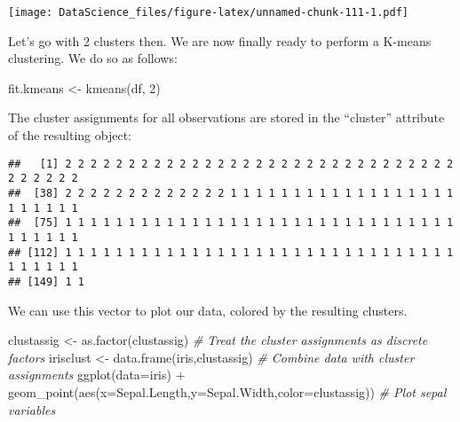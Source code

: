 \documentclass[
]{book}
\newenvironment{Shaded}{\begin{snugshade}}{\end{snugshade}}
\newcommand{\AttributeTok}[1]{\textcolor[rgb]{0.77,0.63,0.00}{#1}}
\newcommand{\CommentTok}[1]{\textcolor[rgb]{0.56,0.35,0.01}{\textit{#1}}}
\newcommand{\DecValTok}[1]{\textcolor[rgb]{0.00,0.00,0.81}{#1}}
\newcommand{\FunctionTok}[1]{\textcolor[rgb]{0.00,0.00,0.00}{#1}}
\newcommand{\NormalTok}[1]{#1}
\newcommand{\OtherTok}[1]{\textcolor[rgb]{0.56,0.35,0.01}{#1}}
\newcommand{\SpecialCharTok}[1]{\textcolor[rgb]{0.00,0.00,0.00}{#1}}
\newcommand{\StringTok}[1]{\textcolor[rgb]{0.31,0.60,0.02}{#1}}
\begin{document}
\begin{Shaded}
\end{Shaded}

\texttt{[image: DataScience\_files/figure-latex/unnamed-chunk-111-1.pdf]}

Let's go with 2 clusters then. We are now finally ready to perform a K-means clustering. We do so as follows:

\begin{Shaded}
\begin{Highlighting}[]
\NormalTok{fit.kmeans }\OtherTok{\textless{}{-}} \FunctionTok{kmeans}\NormalTok{(df, }\DecValTok{2}\NormalTok{)}
\end{Highlighting}
\end{Shaded}

The cluster assignments for all observations are stored in the ``cluster'' attribute of the resulting object:

\begin{Shaded}
\end{Shaded}

\begin{verbatim}
##   [1] 2 2 2 2 2 2 2 2 2 2 2 2 2 2 2 2 2 2 2 2 2 2 2 2 2 2 2 2 2 2 2 2 2 2 2 2 2
##  [38] 2 2 2 2 2 2 2 2 2 2 2 2 2 1 1 1 1 1 1 1 1 1 1 1 1 1 1 1 1 1 1 1 1 1 1 1 1
##  [75] 1 1 1 1 1 1 1 1 1 1 1 1 1 1 1 1 1 1 1 1 1 1 1 1 1 1 1 1 1 1 1 1 1 1 1 1 1
## [112] 1 1 1 1 1 1 1 1 1 1 1 1 1 1 1 1 1 1 1 1 1 1 1 1 1 1 1 1 1 1 1 1 1 1 1 1 1
## [149] 1 1
\end{verbatim}

We can use this vector to plot our data, colored by the resulting clusters.

\begin{Shaded}
\begin{Highlighting}[]
\NormalTok{clustassig }\OtherTok{\textless{}{-}} \FunctionTok{as.factor}\NormalTok{(clustassig) }\CommentTok{\# Treat the cluster assignments as discrete factors}
\NormalTok{irisclust }\OtherTok{\textless{}{-}} \FunctionTok{data.frame}\NormalTok{(iris,clustassig) }\CommentTok{\# Combine data with cluster assignments}
\FunctionTok{ggplot}\NormalTok{(}\AttributeTok{data=}\NormalTok{iris) }\SpecialCharTok{+} \FunctionTok{geom\_point}\NormalTok{(}\FunctionTok{aes}\NormalTok{(}\AttributeTok{x=}\NormalTok{Sepal.Length,}\AttributeTok{y=}\NormalTok{Sepal.Width,}\AttributeTok{color=}\NormalTok{clustassig)) }\CommentTok{\# Plot sepal variables}
\end{Highlighting}
\end{Shaded}
\end{document}
